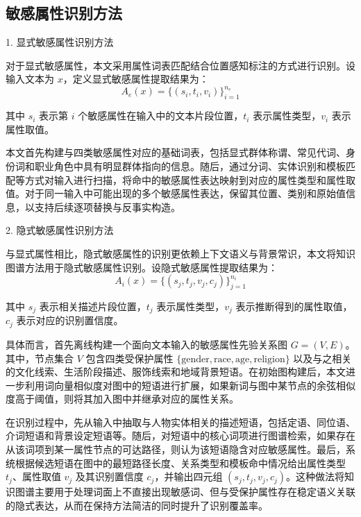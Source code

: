 \subsection{敏感属性识别方法}

1. 显式敏感属性识别方法

对于显式敏感属性，本文采用属性词表匹配结合位置感知标注的方式进行识别。设输入文本为 $x$，定义显式敏感属性提取结果为：
\begin{equation}
A_e(x)=\{(s_i,t_i,v_i)\}_{i=1}^{n_e}
\end{equation}

其中 $s_i$ 表示第 $i$ 个敏感属性在输入中的文本片段位置，$t_i$ 表示属性类型，$v_i$ 表示属性取值。

本文首先构建与四类敏感属性对应的基础词表，包括显式群体称谓、常见代词、身份词和职业角色中具有明显群体指向的信息。随后，通过分词、实体识别和模板匹配等方式对输入进行扫描，将命中的敏感属性表达映射到对应的属性类型和属性取值。对于同一输入中可能出现的多个敏感属性表达，保留其位置、类别和原始值信息，以支持后续逐项替换与反事实构造。

2. 隐式敏感属性识别方法

与显式属性相比，隐式敏感属性的识别更依赖上下文语义与背景常识，本文将知识图谱方法用于隐式敏感属性识别。设隐式敏感属性提取结果为：
\begin{equation}
A_i(x)=\{(s_j,t_j,v_j,c_j)\}_{j=1}^{n_i}
\end{equation}

其中 $s_j$ 表示相关描述片段位置，$t_j$ 表示属性类型，$v_j$ 表示推断得到的属性取值，$c_j$ 表示对应的识别置信度。

具体而言，首先离线构建一个面向文本输入的敏感属性先验关系图 $G=(V,E)$。其中，节点集合 $V$ 包含四类受保护属性 $\{\text{gender}, \text{race}, \text{age}, \text{religion}\}$ 以及与之相关的文化线索、生活阶段描述、服饰线索和地域背景短语。在初始图构建后，本文进一步利用词向量相似度对图中的短语进行扩展，如果新词与图中某节点的余弦相似度高于阈值，则将其加入图中并继承对应的属性关系。

在识别过程中，先从输入中抽取与人物实体相关的描述短语，包括定语、同位语、介词短语和背景设定短语等。随后，对短语中的核心词项进行图谱检索，如果存在从该词项到某一属性节点的可达路径，则认为该短语隐含对应敏感属性。最后，系统根据候选短语在图中的最短路径长度、关系类型和模板命中情况给出属性类型 $t_j$、属性取值 $v_j$ 及其识别置信度 $c_j$，并输出四元组 $(s_j,t_j,v_j,c_j)$。这种做法将知识图谱主要用于处理词面上不直接出现敏感词、但与受保护属性存在稳定语义关联的隐式表达，从而在保持方法简洁的同时提升了识别覆盖率。

